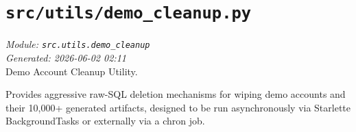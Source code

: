 
\section{\texttt{src/utils/demo\_cleanup.py}}
\textit{Module: \texttt{src.utils.demo\_cleanup}} \\
\textit{Generated: 2026-06-02 02:11} \\

Demo Account Cleanup Utility.

Provides aggressive raw-SQL deletion mechanisms for wiping demo accounts
and their 10,000+ generated artifacts, designed to be run asynchronously
via Starlette BackgroundTasks or externally via a chron job.
